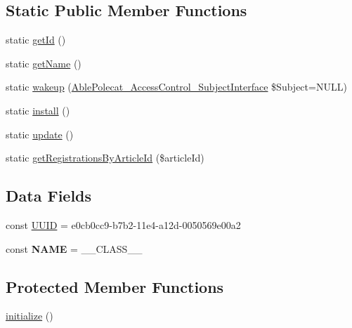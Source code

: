 \subsection*{Static Public Member Functions}
\begin{DoxyCompactItemize}
\item 
static \hyperlink{class_able_polecat___registry___template_acfaa3a96d0cb5a4c0d4d710dcba41e9e}{get\+Id} ()
\item 
static \hyperlink{class_able_polecat___registry___template_a4ef9bd37ba3ce8a13c1e8bcf4f72a630}{get\+Name} ()
\item 
static \hyperlink{class_able_polecat___registry___template_a3f2135f6ad45f51d075657f6d20db2cd}{wakeup} (\hyperlink{interface_able_polecat___access_control___subject_interface}{Able\+Polecat\+\_\+\+Access\+Control\+\_\+\+Subject\+Interface} \$Subject=N\+U\+L\+L)
\item 
static \hyperlink{class_able_polecat___registry___template_a7ee9452dbd39de4bfbe7a6dd9ed7bb65}{install} ()
\item 
static \hyperlink{class_able_polecat___registry___template_a00ce4d238d0651db584337f8e0b38c68}{update} ()
\item 
static \hyperlink{class_able_polecat___registry___template_a2d51d91482f2a2bee63bc46c40dabf6e}{get\+Registrations\+By\+Article\+Id} (\$article\+Id)
\end{DoxyCompactItemize}
\subsection*{Data Fields}
\begin{DoxyCompactItemize}
\item 
const \hyperlink{class_able_polecat___registry___template_a74b892c8c0b86bf9d04c5819898c51e7}{U\+U\+I\+D} = \textquotesingle{}e0cb0cc9-\/b7b2-\/11e4-\/a12d-\/0050569e00a2\textquotesingle{}
\item 
\hypertarget{class_able_polecat___registry___template_a244352f035b82b20b0efa506167fd862}{}const {\bfseries N\+A\+M\+E} = \+\_\+\+\_\+\+C\+L\+A\+S\+S\+\_\+\+\_\+\label{class_able_polecat___registry___template_a244352f035b82b20b0efa506167fd862}

\end{DoxyCompactItemize}
\subsection*{Protected Member Functions}
\begin{DoxyCompactItemize}
\item 
\hyperlink{class_able_polecat___registry___template_a91098fa7d1917ce4833f284bbef12627}{initialize} ()
\end{DoxyCompactItemize}
